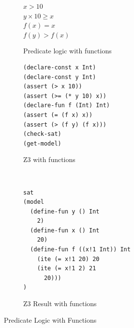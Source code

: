 \documentclass[a4paper]{report}
\begin{document}
\begin{figure}[!htb]
\centering
\begin{subfigure}[b]{\textwidth}
\centering
$x > 10$ \\
$y \times 10 \geq x$ \\
$f(x) = x$ \\
$f(y) > f(x)$
\caption{Predicate logic with functions}
\label{fig:Predicate logic with functions}
\end{subfigure}
\begin{subfigure}[b]{\textwidth}
\lstset{numbers=left, showspaces=false,
    showstringspaces=false, tabsize=2, breaklines=true,
    xleftmargin=5.0ex,
}
\centering
\begin{lstlisting}[frame=single]
(declare-const x Int)
(declare-const y Int)
(assert (> x 10))
(assert (>= (* y 10) x))
(declare-fun f (Int) Int)
(assert (= (f x) x))
(assert (> (f y) (f x)))
(check-sat)
(get-model)
\end{lstlisting}
\caption{Z3 with functions}
\label{fig:Z3 with functions}
\end{subfigure}\\
\begin{subfigure}[b]{\textwidth}
\begin{lstlisting}[frame=single]
sat
(model 
  (define-fun y () Int
    2)
  (define-fun x () Int
    20)
  (define-fun f ((x!1 Int)) Int
    (ite (= x!1 20) 20
    (ite (= x!1 2) 21
      20)))
)
\end{lstlisting}
\caption{Z3 Result with functions}
\label{fig:Z3 Function Result}
\end{subfigure}
\caption{Predicate Logic with Functions}
\label{fig:Predicate Logic with Functions}
\end{figure} 
\end{document}
